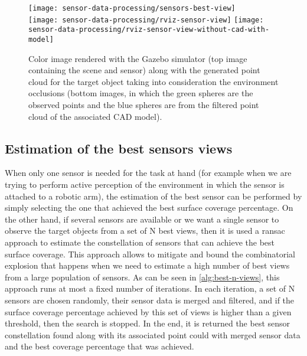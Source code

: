 \begin{figure}
	\centering
	\texttt{[image: sensor-data-processing/sensors-best-view]}\\
	\vspace{0.5em}
	\texttt{[image: sensor-data-processing/rviz-sensor-view]}\hspace{2em}
	\texttt{[image: sensor-data-processing/rviz-sensor-view-without-cad-with-model]}
	\caption{Color image rendered with the Gazebo simulator (top image containing the scene and sensor) along with the generated point cloud for the target object taking into consideration the environment occlusions (bottom images, in which the green spheres are the observed points and the blue spheres are from the filtered point cloud of the associated CAD model).}
\end{figure}


\subsection{Estimation of the best sensors views}

When only one sensor is needed for the task at hand (for example when we are trying to perform active perception of the environment in which the sensor is attached to a robotic arm), the estimation of the best sensor can be performed by simply selecting the one that achieved the best surface coverage percentage. On the other hand, if several sensors are available or we want a single sensor to observe the target objects from a set of N best views, then it is used a \gls{ransac} approach to estimate the constellation of sensors that can achieve the best surface coverage. This approach allows to mitigate and bound the combinatorial explosion that happens when we need to estimate a high number of best views from a large population of sensors. As can be seen in \cref{alg:best-n-views}, this approach runs at most a fixed number of iterations. In each iteration, a set of N sensors are chosen randomly, their sensor data is merged and filtered, and if the surface coverage percentage achieved by this set of views is higher than a given threshold, then the search is stopped. In the end, it is returned the best sensor constellation found along with its associated point could with merged sensor data and the best coverage percentage that was achieved.


